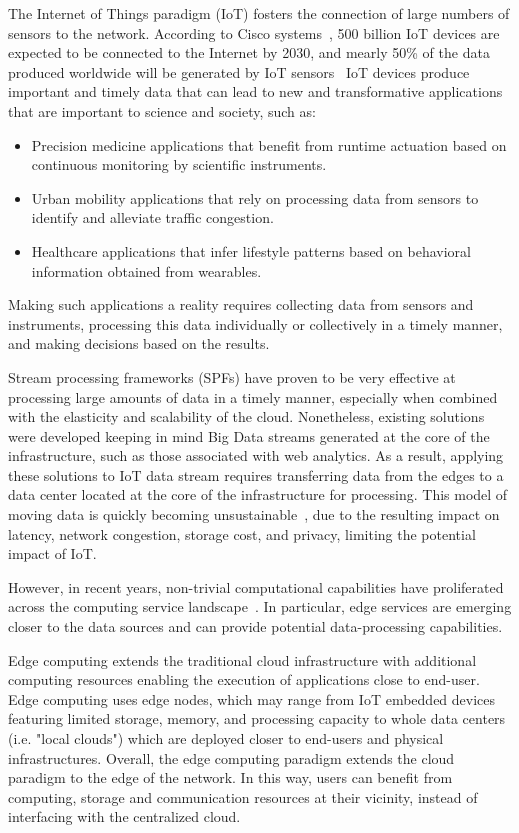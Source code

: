 The Internet of Things paradigm (IoT) fosters the connection of large numbers of sensors to the network. According to Cisco systems~\cite{ciscoGlance}, 500 billion IoT devices are expected to be connected to the Internet by 2030, and mearly 50\% of the data produced worldwide will be generated by IoT sensors~\cite{McAuley}
%
IoT devices produce important and timely data that can lead to new and transformative applications that are important to science and society, such as:
%
\begin{itemize} 
  \item Precision medicine applications that benefit from runtime actuation based on continuous monitoring by scientific instruments.
  \item Urban mobility applications that rely on processing data from sensors to identify and alleviate traffic congestion. 
  \item Healthcare applications that infer lifestyle patterns based on behavioral information obtained from wearables. 
\end{itemize} 

Making such applications a reality requires collecting data from sensors and instruments, processing this data individually or collectively in a timely manner, and making decisions based on the results. 

Stream processing frameworks (SPFs) have proven to be very effective at processing large amounts of data in a timely manner, especially when combined with the elasticity and scalability of the cloud. Nonetheless, existing solutions were developed keeping in mind Big Data streams generated at the core of the infrastructure, such as those associated with web analytics. As a result, applying these solutions to IoT data stream requires transferring data from the edges to a data center located at the core of the infrastructure for processing. This model of moving data is quickly becoming unsustainable~\cite{intro}, due to the resulting impact on latency, network congestion, storage cost, and privacy, limiting the potential impact of IoT.

However, in recent years, non-trivial computational capabilities have proliferated across the computing service landscape~\cite{continuum}. In particular, edge services are emerging closer to the data sources and can provide potential data-processing capabilities\cite{dastjerdi2016fog,bonomi2014fog}. 

Edge computing extends the traditional cloud infrastructure with additional computing resources enabling the execution of applications close to end-user. Edge computing uses edge nodes, which may range from IoT embedded devices featuring limited storage, memory, and processing capacity to whole data centers (i.e. "local clouds") which are deployed closer to end-users and physical infrastructures. Overall, the edge computing paradigm extends the cloud paradigm to the edge of the network. In this way, users can benefit from computing, storage and communication resources at their vicinity, instead of interfacing with the centralized cloud.

